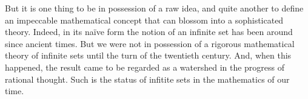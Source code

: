 But it is one thing to be in possession of a raw idea, and quite another to define an impeccable mathematical concept that can blossom into a sophisticated theory. Indeed, in its na\"ive form the notion of an infinite set has been around since ancient times. But we were not in possession of a rigorous mathematical theory of infinite sets until the turn of the twentieth century. And, when this happened, the result came to be regarded as a watershed in the progress of rational thought. Such is the status of infitite sets in the mathematics of our time.